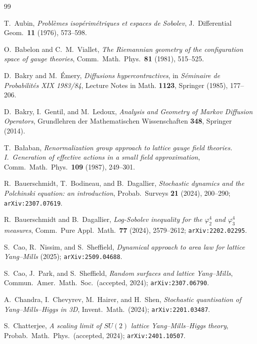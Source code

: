 \documentclass[11pt,a4paper]{amsart}
\theoremstyle{definition}
\begin{document}
\begin{thebibliography}{99}

T.~Aubin,
\emph{Probl\`emes isop\'erim\'etriques et espaces de Sobolev},
J.~Differential Geom.~\textbf{11} (1976), 573--598.

O.~Babelon and C.~M.~Viallet,
\emph{The Riemannian geometry of the configuration space of gauge theories},
Comm.~Math.~Phys.~\textbf{81} (1981), 515--525.

D.~Bakry and M.~\'Emery,
\emph{Diffusions hypercontractives},
in \emph{S\'eminaire de Probabilit\'es XIX 1983/84}, Lecture Notes in Math.
\textbf{1123}, Springer (1985), 177--206.

D.~Bakry, I.~Gentil, and M.~Ledoux,
\emph{Analysis and Geometry of Markov Diffusion Operators},
Grundlehren der Mathematischen Wissenschaften \textbf{348},
Springer (2014).

T.~Ba\l aban,
\emph{Renormalization group approach to lattice gauge field theories.
I.~Generation of effective actions in a small field approximation},
Comm.~Math.~Phys.~\textbf{109} (1987), 249--301.

R.~Bauerschmidt, T.~Bodineau, and B.~Dagallier,
\emph{Stochastic dynamics and the Polchinski equation: an introduction},
Probab.~Surveys \textbf{21} (2024), 200--290;
\texttt{arXiv:2307.07619}.

R.~Bauerschmidt and B.~Dagallier,
\emph{Log-Sobolev inequality for the $\varphi^4_2$ and $\varphi^4_3$ measures},
Comm.~Pure Appl.~Math.~\textbf{77} (2024), 2579--2612;
\texttt{arXiv:2202.02295}.

S.~Cao, R.~Nissim, and S.~Sheffield,
\emph{Dynamical approach to area law for lattice Yang--Mills} (2025);
\texttt{arXiv:2509.04688}.

S.~Cao, J.~Park, and S.~Sheffield,
\emph{Random surfaces and lattice Yang--Mills},
Commun.~Amer.~Math.~Soc.~(accepted, 2024);
\texttt{arXiv:2307.06790}.

A.~Chandra, I.~Chevyrev, M.~Hairer, and H.~Shen,
\emph{Stochastic quantisation of Yang--Mills--Higgs in 3D},
Invent.~Math.~(2024);
\texttt{arXiv:2201.03487}.

S.~Chatterjee,
\emph{A scaling limit of $SU(2)$ lattice Yang--Mills--Higgs theory},
Probab.~Math.~Phys.~(accepted, 2024);
\texttt{arXiv:2401.10507}.


\end{thebibliography}
\end{document}
